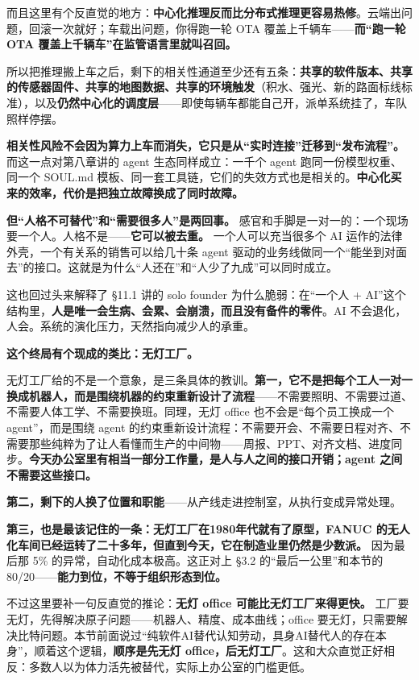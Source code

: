 \documentclass[11pt,a4paper]{ctexart}
\begin{document}
而且这里有个反直觉的地方：\textbf{中心化推理反而比分布式推理更容易热修}。云端出问题，回滚一次就好；车载出问题，你得跑一轮 OTA 覆盖上千辆车——\textbf{而“跑一轮 OTA 覆盖上千辆车”在监管语言里就叫召回。}

所以把推理搬上车之后，剩下的相关性通道至少还有五条：\textbf{共享的软件版本、共享的传感器固件、共享的地图数据、共享的环境触发}（积水、强光、新的路面标线标准），以及\textbf{仍然中心化的调度层}——即使每辆车都能自己开，派单系统挂了，车队照样停摆。

\textbf{相关性风险不会因为算力上车而消失，它只是从“实时连接”迁移到“发布流程”。} 而这一点对第八章讲的 agent 生态同样成立：一千个 agent 跑同一份模型权重、同一个 SOUL.md 模板、同一套工具链，它们的失效方式也是相关的。\textbf{中心化买来的效率，代价是把独立故障换成了同时故障。}

\textbf{但“人格不可替代”和“需要很多人”是两回事。} 感官和手脚是一对一的：一个现场要一个人。人格不是——\textbf{它可以被去重。} 一个人可以充当很多个 AI 运作的法律外壳，一个有关系的销售可以给几十条 agent 驱动的业务线做同一个“能坐到对面去”的接口。这就是为什么“人还在”和“人少了九成”可以同时成立。

这也回过头来解释了 \S{}11.1 讲的 solo founder 为什么脆弱：在“一个人 + AI”这个结构里，\textbf{人是唯一会生病、会累、会崩溃，而且没有备件的零件}。AI 不会退化，人会。系统的演化压力，天然指向减少人的承重。

\textbf{这个终局有个现成的类比：无灯工厂。}

无灯工厂给的不是一个意象，是三条具体的教训。\textbf{第一，它不是把每个工人一对一换成机器人，而是围绕机器的约束重新设计了流程}——不需要照明、不需要过道、不需要人体工学、不需要换班。同理，无灯 office 也不会是“每个员工换成一个 agent”，而是围绕 agent 的约束重新设计流程：不需要开会、不需要日程对齐、不需要那些纯粹为了让人看懂而生产的中间物——周报、PPT、对齐文档、进度同步。\textbf{今天办公室里有相当一部分工作量，是人与人之间的接口开销；agent 之间不需要这些接口。}

\textbf{第二，剩下的人换了位置和职能}——从产线走进控制室，从执行变成异常处理。

\textbf{第三，也是最该记住的一条：无灯工厂在1980年代就有了原型，FANUC 的无人化车间已经运转了二十多年，但直到今天，它在制造业里仍然是少数派。} 因为最后那 5\% 的异常，自动化成本极高。这正对上 \S{}3.2 的“最后一公里”和本节的 80/20——\textbf{能力到位，不等于组织形态到位。}

不过这里要补一句反直觉的推论：\textbf{无灯 office 可能比无灯工厂来得更快。} 工厂要无灯，先得解决原子问题——机器人、精度、成本曲线；office 要无灯，只需要解决比特问题。本节前面说过“纯软件AI替代认知劳动，具身AI替代人的存在本身”，顺着这个逻辑，\textbf{顺序是先无灯 office，后无灯工厂}。这和大众直觉正好相反：多数人以为体力活先被替代，实际上办公室的门槛更低。
\end{document}
